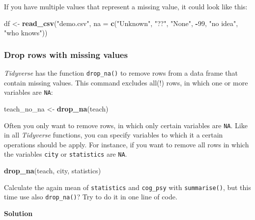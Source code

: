 \documentclass[
]{scrartcl}
\makeatletter
\newenvironment{Shaded}{\begin{snugshade}}{\end{snugshade}}
\newcommand{\AttributeTok}[1]{\textcolor[rgb]{0.13,0.29,0.53}{#1}}
\newcommand{\DecValTok}[1]{\textcolor[rgb]{0.00,0.00,0.81}{#1}}
\newcommand{\FunctionTok}[1]{\textcolor[rgb]{0.13,0.29,0.53}{\textbf{#1}}}
\newcommand{\NormalTok}[1]{#1}
\newcommand{\OtherTok}[1]{\textcolor[rgb]{0.56,0.35,0.01}{#1}}
\newcommand{\SpecialCharTok}[1]{\textcolor[rgb]{0.81,0.36,0.00}{\textbf{#1}}}
\newcommand{\StringTok}[1]{\textcolor[rgb]{0.31,0.60,0.02}{#1}}
\newenvironment{kframe}{%
\medskip{}
\setlength{\fboxsep}{.8em}
 \def\at@end@of@kframe{}%
 \ifinner\ifhmode%
  \def\at@end@of@kframe{\end{minipage}}%
  \begin{minipage}{\columnwidth}%
 \fi\fi%
 \def\FrameCommand##1{\hskip\@totalleftmargin \hskip-\fboxsep
 \colorbox{shadecolor}{##1}\hskip-\fboxsep
     \hskip-\linewidth \hskip-\@totalleftmargin \hskip\columnwidth}%
 \MakeFramed {\advance\hsize-\width
   \@totalleftmargin\z@ \linewidth\hsize
   \@setminipage}}%
 {\par\unskip\endMakeFramed%
 \at@end@of@kframe}
\newenvironment{rmdblock}[1]
  {
  \begin{itemize}
  \renewcommand{\labelitemi}{
    \raisebox{-.7\height}[0pt][0pt]{
      {\setkeys{Gin}{width=3em,keepaspectratio}\texttt{[image: images/\#1]}}
    }
  }
  \setlength{\fboxsep}{1em}
  \begin{kframe}
  \item
  }
  {
  \end{kframe}
  \end{itemize}
  }
\newenvironment{myexercise}
    {\begin{rmdblock}{exercise_green}}
    {\end{rmdblock}}
\newenvironment{webexsolution}[1]
    {\par\tiny\textbf{#1}}
    {\par}
\newcommand{\webexhide}[1]{\begin{webexsolution}{#1}}
\makeatother
\begin{document}
If you have multiple values that represent a missing value, it could look like this:

\begin{Shaded}
\begin{Highlighting}[]
\NormalTok{df }\OtherTok{\textless{}{-}} \FunctionTok{read\_csv}\NormalTok{(}\StringTok{"demo.csv"}\NormalTok{, }\AttributeTok{na =} \FunctionTok{c}\NormalTok{(}\StringTok{"Unknown"}\NormalTok{, }\StringTok{"??"}\NormalTok{, }\StringTok{"None"}\NormalTok{, }\SpecialCharTok{{-}}\DecValTok{99}\NormalTok{,  }\StringTok{"no idea"}\NormalTok{, }\StringTok{"who knows"}\NormalTok{))}
\end{Highlighting}
\end{Shaded}

\hypertarget{drop-rows-with-missing-values}{%
\subsubsection{Drop rows with missing values}\label{drop-rows-with-missing-values}}

\emph{Tidyverse} has the function \texttt{drop\_na()} to remove rows from a data frame that contain missing values. This command excludes all(!) rows, in which one or more variables are \texttt{NA}:

\begin{Shaded}
\begin{Highlighting}[]
\NormalTok{teach\_no\_na }\OtherTok{\textless{}{-}} \FunctionTok{drop\_na}\NormalTok{(teach)}
\end{Highlighting}
\end{Shaded}

Often you only want to remove rows, in which only certain variables are \texttt{NA}. Like in all \emph{Tidyverse} functions, you can specify variables to which it a certain operations should be apply. For instance, if you want to remove all rows in which the variables \texttt{city} or \texttt{statistics} are \texttt{NA}.

\begin{Shaded}
\begin{Highlighting}[]
\FunctionTok{drop\_na}\NormalTok{(teach, city, statistics)}
\end{Highlighting}
\end{Shaded}

\begin{myexercise}
Calculate the again mean of \texttt{statistics} and \texttt{cog\_psy}
with \texttt{summarise()}, but this time use also \texttt{drop\_na()}?
Try to do it in one line of code.
\end{myexercise}
\webexhide{Solution}
\end{document}
